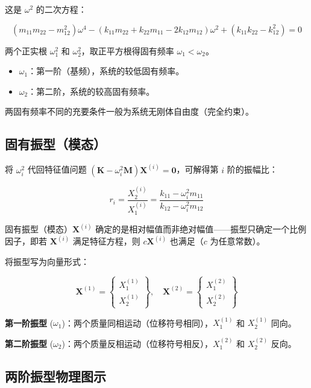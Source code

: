 这是 $\omega^2$ 的二次方程：

\[
(m_{11}m_{22} - m_{12}^2)\omega^4 - (k_{11}m_{22} + k_{22}m_{11} - 2k_{12}m_{12})\omega^2 + (k_{11}k_{22} - k_{12}^2) = 0
\]

两个正实根 $\omega_1^2$ 和 $\omega_2^2$，取正平方根得固有频率 $\omega_1 < \omega_2$。

\begin{itemize}
\item $\omega_1$：第一阶（基频），系统的较低固有频率。
\item $\omega_2$：第二阶，系统的较高固有频率。
\end{itemize}

两固有频率不同的充要条件一般为系统无刚体自由度（完全约束）。

\subsection{固有振型（模态）}

将 $\omega_i^2$ 代回特征值问题 $(\mathbf{K} - \omega_i^2 \mathbf{M}) \mathbf{X}^{(i)} = \mathbf{0}$，可解得第 $i$ 阶的振幅比：

\begin{myformula}
\[
r_i = \frac{X_2^{(i)}}{X_1^{(i)}} = \frac{k_{11} - \omega_i^2 m_{11}}{k_{12} - \omega_i^2 m_{12}}
\]
\end{myformula}

固有振型（模态）$\mathbf{X}^{(i)}$ 确定的是相对幅值而非绝对幅值——振型只确定一个比例因子，即若 $\mathbf{X}^{(i)}$ 满足特征方程，则 $c\mathbf{X}^{(i)}$ 也满足（$c$ 为任意常数）。

将振型写为向量形式：

\[
\mathbf{X}^{(1)} = \begin{Bmatrix} X_1^{(1)} \\ X_2^{(1)} \end{Bmatrix},\quad 
\mathbf{X}^{(2)} = \begin{Bmatrix} X_1^{(2)} \\ X_2^{(2)} \end{Bmatrix}
\]

\textbf{第一阶振型} ($\omega_1$)：两个质量同相运动（位移符号相同），$X_1^{(1)}$ 和 $X_2^{(1)}$ 同向。

\textbf{第二阶振型} ($\omega_2$)：两个质量反相运动（位移符号相反），$X_1^{(2)}$ 和 $X_2^{(2)}$ 反向。

\subsection{两阶振型物理图示}

